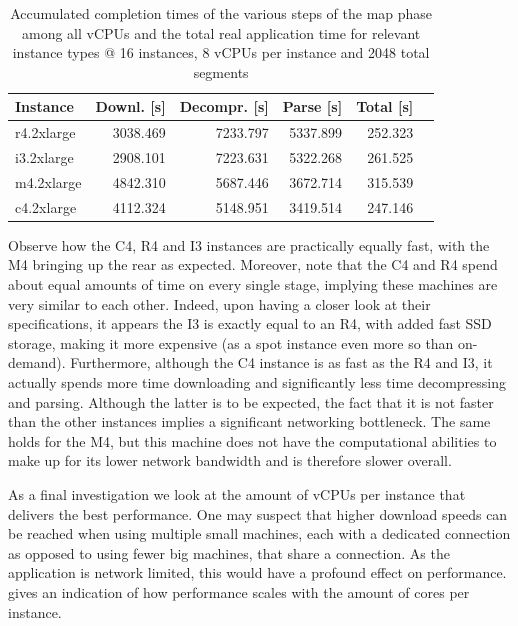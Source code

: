 \documentclass{article}
\begin{document}
\begin{table}[H]
	\centering
	\caption{Accumulated completion times of the various steps of the map phase among all vCPUs and the total real application time for relevant instance types @ 16 instances, 8 vCPUs per instance and 2048 total segments}
	\label{tab:instance-comparison}

	\begin{tabular}{lrrrrr}
	\toprule
	Instance	& 	Downl. [s]	& Decompr. [s]	& Parse [s] 	& Total [s]	\\
	\midrule
	r4.2xlarge	&	3038.469	&	7233.797	&	5337.899	&	252.323 \\
	i3.2xlarge	&	2908.101	&	7223.631	&	5322.268	&	261.525 \\
	m4.2xlarge	&	4842.310	&	5687.446	&	3672.714	&	315.539 \\
	c4.2xlarge	&	4112.324	&	5148.951	&	3419.514	&	247.146 \\
	\bottomrule
	\end{tabular}
\end{table}

Observe how the C4, R4 and I3 instances are practically equally fast, with the M4 bringing up the rear as expected.
Moreover, note that the C4 and R4 spend about equal amounts of time on every single stage, implying these machines are very similar to each other.
Indeed, upon having a closer look at their specifications, it appears the I3 is exactly equal to an R4, with added fast SSD storage, making it more expensive (as a spot instance even more so than on-demand).
Furthermore, although the C4 instance is as fast as the R4 and I3, it actually spends more time downloading and significantly less time decompressing and parsing.
Although the latter is to be expected, the fact that it is not faster than the other instances implies a significant networking bottleneck.
The same holds for the M4, but this machine does not have the computational abilities to make up for its lower network bandwidth and is therefore slower overall.

As a final investigation we look at the amount of vCPUs per instance that delivers the best performance.
One may suspect that higher download speeds can be reached when using multiple small machines, each with a dedicated connection as opposed to using fewer big machines, that share a connection.
As the application is network limited, this would have a profound effect on performance.
 gives an indication of how performance scales with the amount of cores per instance.
\end{document}
